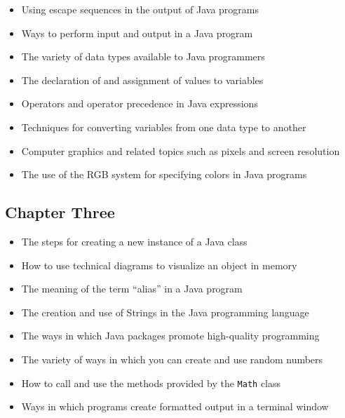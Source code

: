 \begin{itemize}

  \itemsep -.015in
  \item Using escape sequences in the output of Java programs
  \item Ways to perform input and output in a Java program
  \item The variety of data types available to Java programmers
  \item The declaration of and assignment of values to variables
  \item Operators and operator precedence in Java expressions
  \item Techniques for converting variables from one data type to another
  \item Computer graphics and related topics such as pixels and screen resolution
  \item The use of the RGB system for specifying colors in Java programs

\end{itemize}

\vspace*{-.25in}
\subsection*{Chapter Three}
\vspace*{-.1in}

\begin{itemize}

  \itemsep -.015in
  \item The steps for creating a new instance of a Java class
  \item How to use technical diagrams to visualize an object in memory
  \item The meaning of the term ``alias'' in a Java program
  \item The creation and use of Strings in the Java programming language
  \item The ways in which Java packages promote high-quality programming
  \item The variety of ways in which you can create and use random numbers
  \item How to call and use the methods provided by the {\tt Math} class
  \item Ways in which programs create formatted output in a terminal window

\end{itemize}

\vspace*{-.25in}

